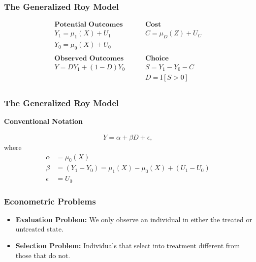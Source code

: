 \begin{frame}
\frametitle{The Generalized Roy Model}

\begin{align*}
\textbf{Potential Outcomes} &\qquad \textbf{Cost} \\
Y_1 = \mu_1(X) + U_1      &\qquad C = \mu_D(Z) + U_C \\
Y_0 = \mu_0(X) + U_0      &\qquad \\
    & \\
\textbf{Observed Outcomes } &\qquad \textbf{Choice} \\
Y = D Y_1 + (1 - D)Y_0 &\qquad S = Y_1 - Y_0 - C \\
                       &\qquad D = \mathrm{I}[S > 0] \\
\end{align*}

\end{frame}


\begin{frame}
\frametitle{The Generalized Roy Model}
\textbf{Conventional Notation}

\begin{align*}
Y = \alpha + \beta D + \epsilon,
\end{align*}
where
\begin{align*}
\alpha &= \mu_0(X)  \\
\beta  & = (Y_1 - Y_0) =\mu_1(X) - \mu_0(X)  + (U_1 - U_0)\\
\epsilon & =U_0
\end{align*}

\end{frame}


\begin{frame}
\frametitle{Econometric Problems}

\begin{itemize}
\item
  \textbf{Evaluation Problem:} We only observe an individual in either
  the treated or untreated state.
\item
  \textbf{Selection Problem:} Individuals that select into treatment
  different from those that do not.
\end{itemize}

\end{frame}


